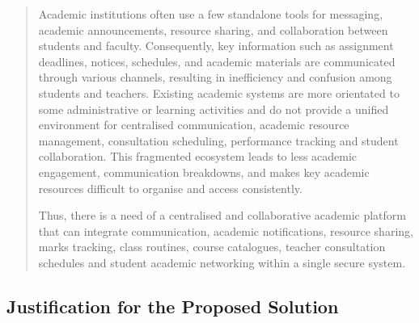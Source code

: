 \documentclass[12pt,a4paper]{article}
\begin{document}
\begin{quote}
Academic institutions often use a few standalone tools for messaging, academic announcements, resource sharing, and collaboration between students and faculty. Consequently, key information such as assignment deadlines, notices, schedules, and academic materials are communicated through various channels, resulting in inefficiency and confusion among students and teachers. Existing academic systems are more orientated to some administrative or learning activities and do not provide a unified environment for centralised communication, academic resource management, consultation scheduling, performance tracking and student collaboration. This fragmented ecosystem leads to less academic engagement, communication breakdowns, and makes key academic resources difficult to organise and access consistently.

Thus, there is a need of a centralised and collaborative academic platform that can integrate communication, academic notifications, resource sharing, marks tracking, class routines, course catalogues, teacher consultation schedules and student academic networking within a single secure system.
\end{quote}
\newpage
\subsection{Justification for the Proposed Solution}
\end{document}
